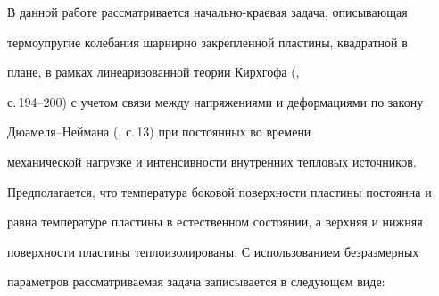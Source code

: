 




\maketitle


\label{begin}








В данной работе рассматривается начально-краевая задача, описывающая


термоупругие колебания шарнирно закрепленной пластины, квадратной в


плане, в рамках линеаризованной теории Кирхгофа (\cite{D1},


с.\,194--200) с учетом связи между напряжениями и деформациями по закону


Дюамеля--Неймана (\cite{N2}, с.\,13) при постоянных во времени


механической нагрузке и интенсивности внутренних тепловых источников.


Предполагается, что температура боковой поверхности пластины постоянна и


равна температуре пластины в естественном состоянии, а верхняя и нижняя


поверхности пластины теплоизолированы. С использованием безразмерных


параметров рассматриваемая задача записывается в следующем виде:


